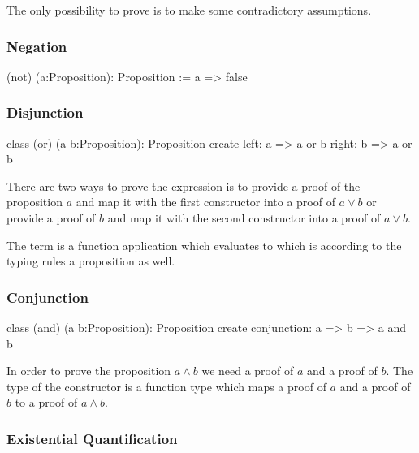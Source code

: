 The only possibility to prove  is to make some contradictory
assumptions. \vskip 2mm




\subsubsection{Negation}
%
\begin{alba}
  (not) (a:Proposition): Proposition
    := a => false
\end{alba}
\vskip 2mm






\subsubsection{Disjunction}
%
\begin{alba}
  class
    (or) (a b:Proposition): Proposition
  create
    left:  a => a or b
    right: b => a or b
\end{alba}

There are two ways to prove the expression  is to provide a proof
of the proposition $a$ and map it with the first constructor into a proof of
$a \lor b$ or provide a proof of $b$ and map it with the second constructor
into a proof of $a \lor b$.

The term  is a function application which evaluates to
 which is according to the typing rules a proposition
as well.
\newline




\subsubsection{Conjunction}
%
\begin{alba}
  class
    (and) (a b:Proposition): Proposition
  create
    conjunction: a => b => a and b
\end{alba}

In order to prove the proposition $a \land b$ we need a proof of $a$ and a
proof of $b$. The type of the constructor is a function type which maps a
proof of $a$ and a proof of $b$ to a proof of $a \land b$.
\newline





\subsubsection{Existential Quantification}

